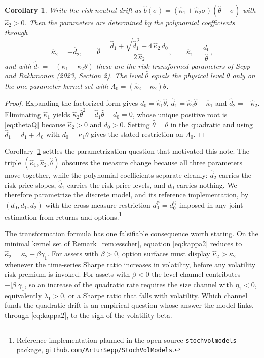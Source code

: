 \documentclass[11pt]{article}
\newtheorem{corollary}[theorem]{Corollary}
\theoremstyle{remark}
\newcommand{\Pm}{\mathbb{P}}
\newcommand{\Qm}{\mathbb{Q}}
\begin{document}
\begin{corollary}\label{cor:theta}
Write the risk-neutral drift as
$\hat b(\sigma)=(\hat\kappa_1+\hat\kappa_2\sigma)(\hat\theta-\sigma)$ with
$\hat\kappa_2>0$.
Then the parameters are determined by the polynomial coefficients through
\begin{equation}\label{eq:thetaQ}
\hat\kappa_2=-\hat d_2,\qquad
\hat\theta
=\frac{\hat d_1+\sqrt{\hat d_1^{\,2}+4\,\hat\kappa_2\,d_0}}
{2\,\hat\kappa_2},
\qquad
\hat\kappa_1=\frac{d_0}{\hat\theta},
\end{equation}
and with $\hat d_1=-(\kappa_1-\kappa_2\theta)$ these are the
risk-transformed parameters of Sepp and Rakhmonov (2023, Section 2).
The level $\hat\theta$ equals the physical level $\theta$ only on the
one-parameter kernel set with $\Lambda_0=(\hat\kappa_2-\kappa_2)\theta$.
\end{corollary}

\begin{proof}
Expanding the factorized form gives $d_0=\hat\kappa_1\hat\theta$,
$\hat d_1=\hat\kappa_2\hat\theta-\hat\kappa_1$ and
$\hat d_2=-\hat\kappa_2$.
Eliminating $\hat\kappa_1$ yields
$\hat\kappa_2\hat\theta^2-\hat d_1\hat\theta-d_0=0$, whose unique positive
root is \eqref{eq:thetaQ} because $\hat\kappa_2>0$ and $d_0>0$.
Setting $\hat\theta=\theta$ in the quadratic and using
$\hat d_1=d_1+\Lambda_0$ with $d_0=\kappa_1\theta$ gives the stated
restriction on $\Lambda_0$.
\end{proof}

Corollary~\ref{cor:theta} settles the parametrization question that
motivated this note.
The triple $(\hat\kappa_1,\hat\kappa_2,\hat\theta)$ obscures the measure
change because all three parameters move together, while the polynomial
coefficients separate cleanly: $\hat d_2$ carries the risk-price slopes,
$\hat d_1$ carries the risk-price levels, and $d_0$ carries nothing.
We therefore parametrize the discrete model, and its reference
implementation, by $(d_0,d_1,d_2)$ with the cross-measure restriction
$d_0^{\Pm}=d_0^{\Qm}$ imposed in any joint estimation from returns and
options.\footnote{Reference implementation planned in the open-source
\texttt{stochvolmodels} package,
\texttt{github.com/ArturSepp/StochVolModels}.}

The transformation formula has one falsifiable consequence worth stating.
On the minimal kernel set of Remark~\ref{rem:esscher}, equation
\eqref{eq:kappa2} reduces to $\hat\kappa_2=\kappa_2+\beta\gamma_1$.
For assets with $\beta>0$, option surfaces must display
$\hat\kappa_2>\kappa_2$ whenever the time-series Sharpe ratio increases in
volatility, before any volatility risk premium is invoked.
For assets with $\beta<0$ the level channel contributes
$-|\beta|\gamma_1$, so an increase of the quadratic rate requires the size
channel with $\eta_1<0$, equivalently $\bar\lambda_1>0$, or a Sharpe ratio
that falls with volatility.
Which channel funds the quadratic drift is an empirical question whose
answer the model links, through \eqref{eq:kappa2}, to the sign of the
volatility beta.
\end{document}
